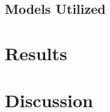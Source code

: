 \documentclass[manuscript,screen,review,nonacm]{acmart}
\begin{document}
\subsection{Models Utilized}

\section{Results}

\section{Discussion}




\end{document}
